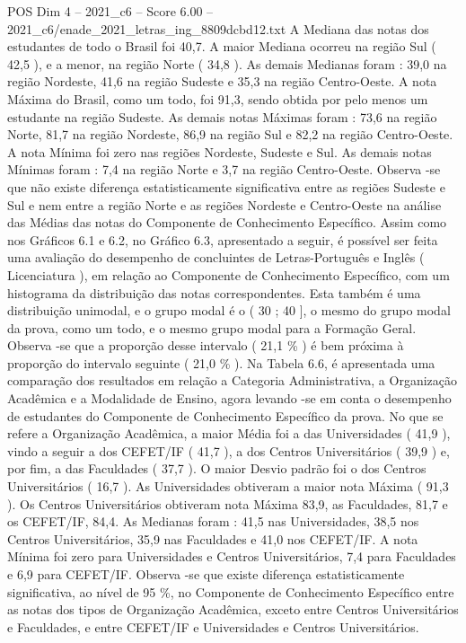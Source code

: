 \begin{textsample}{POS Dim 4 – 2021\_c6 – Score 6.00 – 2021\_c6/enade\_2021\_letras\_ing\_8809dcbd12.txt}
A Mediana das notas dos estudantes de todo o Brasil foi 40,7.
A maior Mediana ocorreu na região Sul ( 42,5 ), e a menor, na região Norte ( 34,8 ).
As demais Medianas foram : 39,0 na região Nordeste, 41,6 na região Sudeste e 35,3 na região Centro-Oeste.
A nota Máxima do Brasil, como um todo, foi 91,3, sendo obtida por pelo menos um estudante na região Sudeste.
As demais notas Máximas foram : 73,6 na região Norte, 81,7 na região Nordeste, 86,9 na região Sul e 82,2 na região Centro-Oeste.
A nota Mínima foi zero nas regiões Nordeste, Sudeste e Sul.
As demais notas Mínimas foram : 7,4 na região Norte e 3,7 na região Centro-Oeste.
Observa -se que não existe diferença estatisticamente significativa entre as regiões Sudeste e Sul e nem entre a região Norte e as regiões Nordeste e Centro-Oeste na análise das Médias das notas do Componente de Conhecimento Específico.
Assim como nos Gráficos 6.1 e 6.2, no Gráfico 6.3, apresentado a seguir, é possível ser feita uma avaliação do desempenho de concluintes de Letras-Português e Inglês ( Licenciatura ), em relação ao Componente de Conhecimento Específico, com um histograma da distribuição das notas correspondentes.
Esta também é uma distribuição unimodal, e o grupo modal é o ( 30 ; 40 ], o mesmo do grupo modal da prova, como um todo, e o mesmo grupo modal para a Formação Geral.
Observa -se que a proporção desse intervalo ( 21,1 \% ) é bem próxima à proporção do intervalo seguinte ( 21,0 \% ).
Na Tabela 6.6, é apresentada uma comparação dos resultados em relação a Categoria Administrativa, a Organização Acadêmica e a Modalidade de Ensino, agora levando -se em conta o desempenho de estudantes do Componente de Conhecimento Específico da prova.
No que se refere a Organização Acadêmica, a maior Média foi a das Universidades ( 41,9 ), vindo a seguir a dos CEFET/IF ( 41,7 ), a dos Centros Universitários ( 39,9 ) e, por fim, a das Faculdades ( 37,7 ).
O maior Desvio padrão foi o dos Centros Universitários ( 16,7 ).
As Universidades obtiveram a maior nota Máxima ( 91,3 ).
Os Centros Universitários obtiveram nota Máxima 83,9, as Faculdades, 81,7 e os CEFET/IF, 84,4.
As Medianas foram : 41,5 nas Universidades, 38,5 nos Centros Universitários, 35,9 nas Faculdades e 41,0 nos CEFET/IF.
A nota Mínima foi zero para Universidades e Centros Universitários, 7,4 para Faculdades e 6,9 para CEFET/IF.
Observa -se que existe diferença estatisticamente significativa, ao nível de 95 \%, no Componente de Conhecimento Específico entre as notas dos tipos de Organização Acadêmica, exceto entre Centros Universitários e Faculdades, e entre CEFET/IF e Universidades e Centros Universitários.

\end{textsample}
